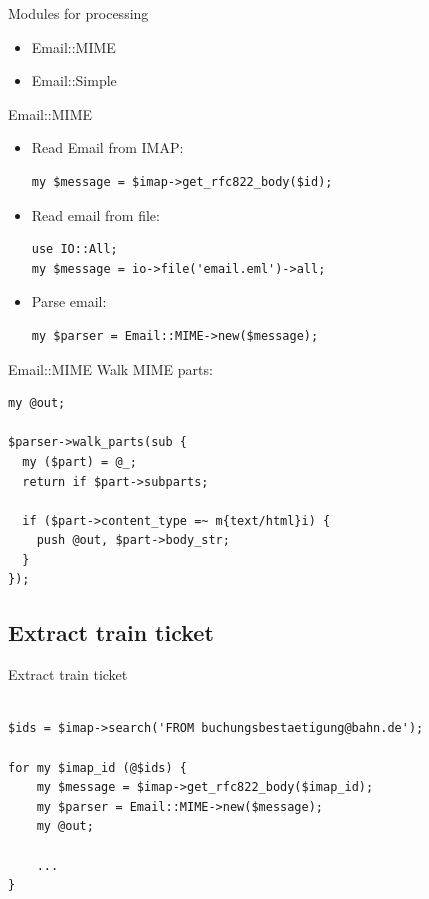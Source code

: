 \begin{frame}{Modules for processing}
  \begin{itemize}
  \item Email::MIME
  \item Email::Simple
  \end{itemize}
\end{frame}

\begin{frame}[fragile]{Email::MIME}
  \begin{itemize}
    \item Read Email from IMAP:

\begin{verbatim}
my $message = $imap->get_rfc822_body($id);
\end{verbatim}

  \item Read email from file:

\begin{verbatim}
use IO::All;
my $message = io->file('email.eml')->all;
\end{verbatim}

  \item Parse email:

\begin{verbatim}
my $parser = Email::MIME->new($message);
\end{verbatim}

\end{itemize}  
\end{frame}

\begin{frame}[fragile]{Email::MIME}
Walk MIME parts:

\begin{verbatim}
my @out;

$parser->walk_parts(sub {
  my ($part) = @_;
  return if $part->subparts;

  if ($part->content_type =~ m{text/html}i) {
    push @out, $part->body_str;
  }
});
\end{verbatim}
\end{frame}

\subsection{Extract train ticket}

\begin{frame}[fragile]{Extract train ticket}
\begin{verbatim}

$ids = $imap->search('FROM buchungsbestaetigung@bahn.de');

for my $imap_id (@$ids) {
    my $message = $imap->get_rfc822_body($imap_id);
    my $parser = Email::MIME->new($message);
    my @out;

    ...
}

\end{verbatim}
\end{frame}

